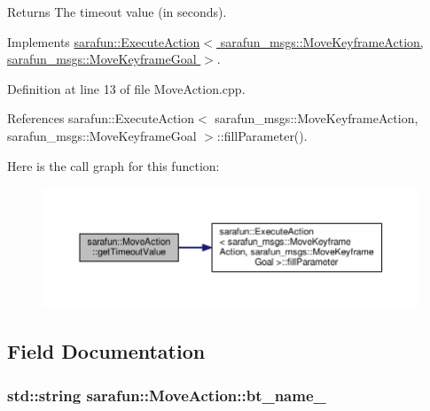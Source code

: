 \begin{DoxyReturn}{Returns}
The timeout value (in seconds). 
\end{DoxyReturn}


Implements \hyperlink{classsarafun_1_1ExecuteAction_aba6cfa8a8ce19e735eb6394424df6d17_aba6cfa8a8ce19e735eb6394424df6d17}{sarafun\-::\-Execute\-Action$<$ sarafun\-\_\-msgs\-::\-Move\-Keyframe\-Action, sarafun\-\_\-msgs\-::\-Move\-Keyframe\-Goal $>$}.



Definition at line 13 of file Move\-Action.\-cpp.



References sarafun\-::\-Execute\-Action$<$ sarafun\-\_\-msgs\-::\-Move\-Keyframe\-Action, sarafun\-\_\-msgs\-::\-Move\-Keyframe\-Goal $>$\-::fill\-Parameter().



Here is the call graph for this function\-:\nopagebreak
\begin{figure}[H]
\begin{center}
\leavevmode
\includegraphics[width=350pt]{d6/d0e/classsarafun_1_1MoveAction_a3a0d4d2919b30b878c603a884db6a470_a3a0d4d2919b30b878c603a884db6a470_cgraph}
\end{center}
\end{figure}




\subsection{Field Documentation}
\hypertarget{classsarafun_1_1MoveAction_a8ae9ed380906de1299fdf28d43420b71_a8ae9ed380906de1299fdf28d43420b71}{
\subsubsection[{bt\-\_\-name\-\_\-}]{\setlength{\rightskip}{0pt plus 5cm}std\-::string sarafun\-::\-Move\-Action\-::bt\-\_\-name\-\_\-\hspace{0.3cm}{\ttfamily [private]}}}\label{classsarafun_1_1MoveAction_a8ae9ed380906de1299fdf28d43420b71_a8ae9ed380906de1299fdf28d43420b71}


